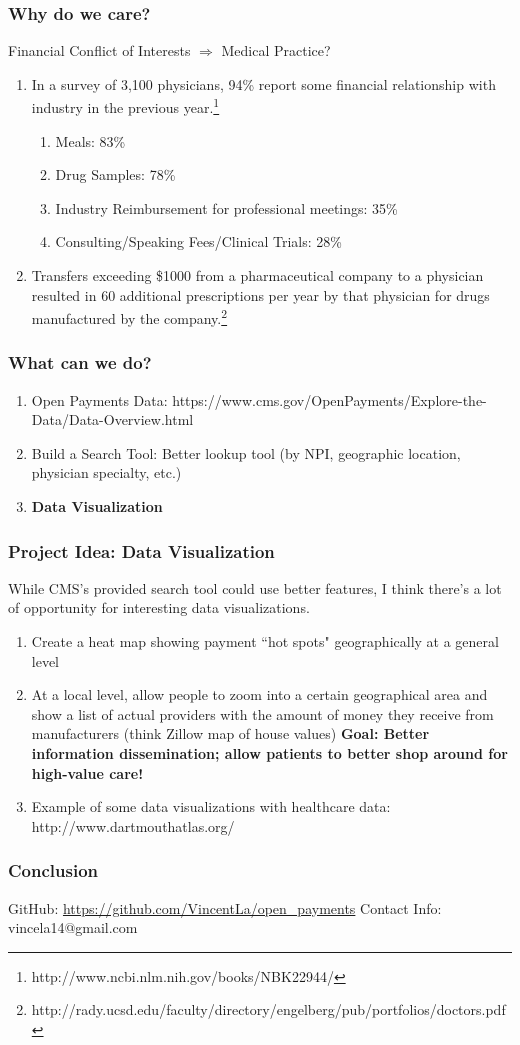 \documentclass{beamer}
\begin{document}
\begin{frame} 
\frametitle{Why do we care?}
Financial Conflict of Interests $\Rightarrow$ Medical Practice?
\begin{enumerate}
\item In a survey of 3,100 physicians, 94\% report some financial relationship with industry in the previous year.\footnote{http://www.ncbi.nlm.nih.gov/books/NBK22944/}

\begin{enumerate}
\item Meals: 83\%
\item Drug Samples: 78\%
\item Industry Reimbursement for professional meetings: 35\%
\item Consulting/Speaking Fees/Clinical Trials: 28\%
\end{enumerate}

\item Transfers exceeding \$1000 from a pharmaceutical company to a physician resulted in 60 additional prescriptions per year by that physician for drugs manufactured by the company.\footnote{http://rady.ucsd.edu/faculty/directory/engelberg/pub/portfolios/doctors.pdf}
\end{enumerate}
\end{frame}

\begin{frame} 
\frametitle{What can we do?}
\begin{enumerate}
\item Open Payments Data: https://www.cms.gov/OpenPayments/Explore-the-Data/Data-Overview.html
\item Build a Search Tool: Better lookup tool (by NPI, geographic location, physician specialty, etc.)
\item \textbf{Data Visualization}
\end{enumerate}
\end{frame}

\begin{frame} 
\frametitle{Project Idea: Data Visualization}
While CMS's provided search tool could use better features, I think there's a lot of opportunity for interesting data visualizations.

\begin{enumerate}
\item Create a heat map showing payment ``hot spots" geographically at a general level
\item At a local level, allow people to zoom into a certain geographical area and show a list of actual providers with the amount of money they receive from manufacturers (think Zillow map of house values)
\textbf{Goal: Better information dissemination; allow patients to better shop around for high-value care!}
\item Example of some data visualizations with healthcare data: http://www.dartmouthatlas.org/
\end{enumerate}
\end{frame}

\begin{frame} 
\frametitle{Conclusion}
GitHub: \url{https://github.com/VincentLa/open\_payments}
\newline
Contact Info: vincela14@gmail.com
\end{frame}
\end{document}
